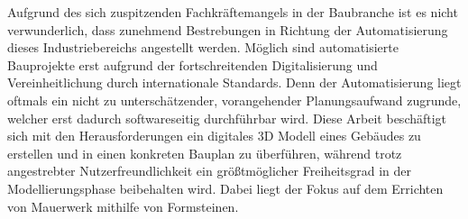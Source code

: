 Aufgrund des sich zuspitzenden Fachkräftemangels in der Baubranche ist es nicht verwunderlich, dass zunehmend Bestrebungen in Richtung der Automatisierung dieses Industriebereichs angestellt werden.
Möglich sind automatisierte Bauprojekte erst aufgrund der fortschreitenden Digitalisierung und Vereinheitlichung durch internationale Standards.
Denn der Automatisierung liegt oftmals ein nicht zu unterschätzender, vorangehender Planungsaufwand zugrunde, welcher erst dadurch softwareseitig durchführbar wird.
Diese Arbeit beschäftigt sich mit den Herausforderungen ein digitales 3D Modell eines Gebäudes zu erstellen und in einen konkreten Bauplan zu überführen, während trotz angestrebter Nutzerfreundlichkeit ein größtmöglicher Freiheitsgrad in der Modellierungsphase beibehalten wird.
Dabei liegt der Fokus auf dem Errichten von Mauerwerk mithilfe von Formsteinen.